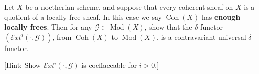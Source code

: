 Let $X$ be a noetherian scheme, and suppose that every coherent sheaf on $X$ is a quotient of a locally free sheaf. In this case we say $\operatorname{Coh}(X)$ has \textbf{enough locally frees}. Then for any $\mathcal{G} \in \operatorname{Mod}(X)$, show that the $\delta$-functor $(\mathcal{E}xt^i(\cdot, \mathcal{G}))$, from $\operatorname{Coh}(X)$ to $\operatorname{Mod}(X)$, is a contravariant universal $\delta$-functor.

[Hint: Show $\mathcal{E}xt^i(\cdot, \mathcal{G})$ is coeffaceable for $i > 0$.]
